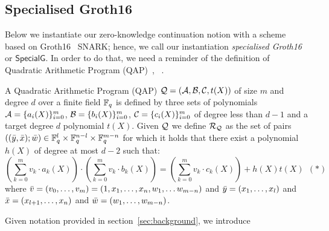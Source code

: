 
\subsection{Specialised Groth16}
\label{sec:rvrf_groth16}

Below we instantiate our zero-knowledge continuation notion with a scheme based on Groth16~\cite{Groth16} SNARK;
hence, we call our instantiation \emph{specialised Groth16} or \emph{$\mathsf{SpecialG}$}. In order to do that, we need a 
reminder of the definition of Quadratic Arithmetic Program (QAP)~\cite{LegoSNARK}, ~\cite{GGPR13}.

\begin{definition}[QAP] 
\label{def:QAP}
A Quadratic Arithmetic Program (QAP) $\mathcal{Q} = (\mathcal{A}, \mathcal{B}, \mathcal{C}, t(X))$ of size $m$ 
and degree $d$ over a finite field $\mathbb{F}_q$ is defined by three sets of polynomials $\mathcal{A} = \{a_i(X)\}_{i=0}^m$, 
$\mathcal{B} = \{b_i(X)\}_{i=0}^m$, $\mathcal{C} = \{c_i(X)\}_{i=0}^m$ of degree less than $d-1$ and a target degree $d$ polynomial $t(X)$. Given 
$\mathcal{Q}$ we define $\mathcal{R}_{\mathcal{Q}}$ as the set of pairs $((\bar{y}, \bar{x}); \bar{w}) \in \mathbb{F}_q^{l} \times \mathbb{F}_q^{n-l} \times \mathbb{F}_q^{m-n}$ for which it 
holds that there exist a polynomial $h(X)$ of degree at most $d-2$ such that:
$$(\sum_{k=0}^m v_k \cdot a_k(X)) \cdot (\sum_{k=0}^m v_k \cdot b_k(X)) = (\sum_{k=0}^m v_k \cdot c_k(X)) + h(X)t(X) \ \ (\ast)$$ 
where $\bar{v} = (v_0, \ldots, v_m) = (1, x_1, \ldots, x_n, w_1, \ldots w_{m-n})$ and $\bar{y} = (x_1, \ldots, x_l)$ and 
$\bar{x} = (x_{l+1}, \ldots, x_n)$ and $\bar{w} = (w_1, \ldots, w_{m-n})$. 
\end{definition}

\noindent Given notation provided in section~\ref{sec:background}, we introduce

